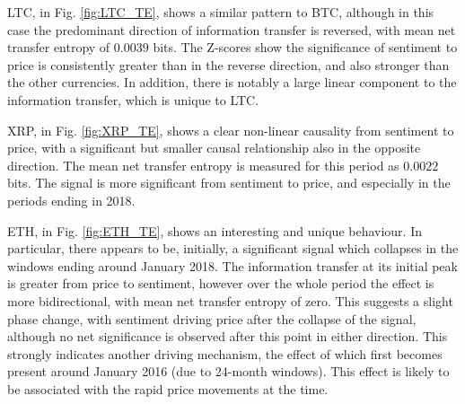 \documentclass[]{rsos}%
\begin{document}
  LTC, in Fig. \ref{fig:LTC_TE}, shows a similar pattern to BTC, although in this case the predominant direction of information transfer is reversed, with mean net transfer entropy of $0.0039$ bits. The Z-scores show the significance of sentiment to price is consistently greater than in the reverse direction, and also stronger than the other currencies. In addition, there is notably a large linear component to the information transfer, which is unique to LTC. 

  XRP, in Fig. \ref{fig:XRP_TE}, shows a clear non-linear causality from sentiment to price, with a significant but smaller causal relationship also in the opposite direction. The mean net transfer entropy is measured for this period as $0.0022$ bits. The signal is more significant from sentiment to price, and especially in the periods ending in 2018. 
  
  ETH, in Fig. \ref{fig:ETH_TE}, shows an interesting and unique behaviour. In particular, there appears to be, initially, a significant signal which collapses in the windows ending around January 2018. The information transfer at its initial peak is greater from price to sentiment, however over the whole period the effect is more bidirectional, with mean net transfer entropy of zero. This suggests a slight phase change, with sentiment driving price after the collapse of the signal, although no net significance is observed after this point in either direction. This strongly indicates another driving mechanism, the effect of which first becomes present around January 2016 (due to 24-month windows). This effect is likely to be associated with the rapid price movements at the time.  %
  
\end{document}
